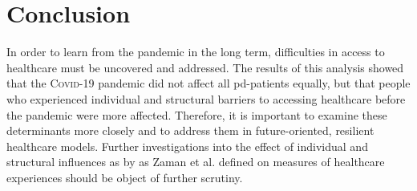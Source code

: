 \documentclass{bmcart}
\begin{document}
\section*{Conclusion}
In order to learn from the pandemic in the long term, difficulties in access to healthcare must be uncovered and addressed. The results of this analysis showed that the \textsc{Covid}-19 pandemic did not affect all \ac{pd}-patients equally, but that people who experienced individual and structural barriers to accessing healthcare before the pandemic were more affected. Therefore, it is important to examine these determinants more closely and to address them in future-oriented, resilient healthcare models. Further investigations into the effect of individual and structural influences as by as Zaman et al. defined on measures of healthcare experiences should be object of further scrutiny.


\end{document}
